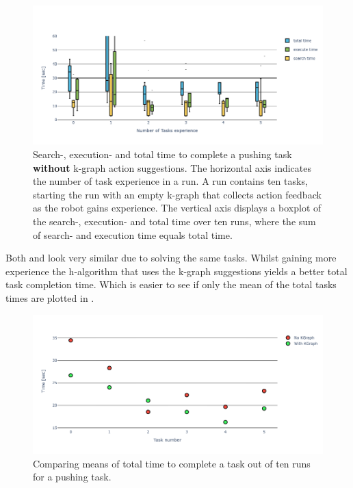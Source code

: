 \begin{figure}[H]
    \centering
    \includegraphics[width=\textwidth]{figures/results/random_push_time_no_k-graph}
    \caption{Search-, execution- and total time to complete a pushing task \textbf{without} \ac{k-graph} action suggestions. The horizontal axis indicates the number of task experience in a run. A run contains ten tasks, starting the run with an empty \ac{k-graph} that collects action feedback as the robot gains experience. The vertical axis displays a boxplot of the search-, execution- and total time over ten runs, where the sum of search- and execution time equals total time.}%
    \label{fig:random_push_time_no_k-graph}
\end{figure}

Both  and  look very similar due to solving the same tasks. Whilst gaining more experience the \ac{h-algorithm} that uses the \ac{k-graph} suggestions yields a better total task completion time. Which is easier to see if only the mean of the total tasks times are plotted in . 

\begin{figure}[H]
    \centering
    \includegraphics[width=\textwidth]{figures/results/random_push_time_vs}
    \caption{Comparing means of total time to complete a task out of ten runs for a pushing task.}\label{fig:random_push_time_vs}
\end{figure}


